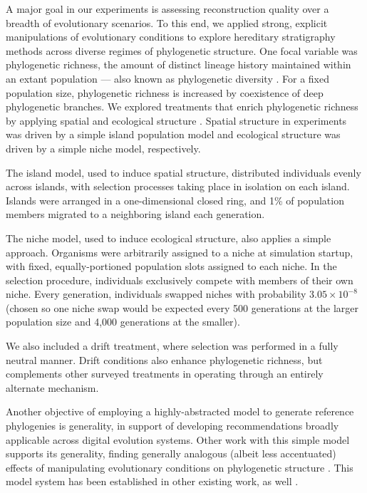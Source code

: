 A major goal in our experiments is assessing reconstruction quality over a breadth of evolutionary scenarios.
To this end, we applied strong, explicit manipulations of evolutionary conditions to explore hereditary stratigraphy methods across diverse regimes of phylogenetic structure.
One focal variable was phylogenetic richness, the amount of distinct lineage history maintained within an extant population --- also known as phylogenetic diversity \citep{tucker2017guide}.
For a fixed population size, phylogenetic richness is increased by coexistence of deep phylogenetic branches.
We explored treatments that enrich phylogenetic richness by applying spatial and ecological structure \citep{moreno2024ecology,gomez2019understanding,valiente2007facilitation}.
Spatial structure in experiments was driven by a simple island population model and ecological structure was driven by a simple niche model, respectively.

The island model, used to induce spatial structure, distributed individuals evenly across islands, with selection processes taking place in isolation on each island.
Islands were arranged in a one-dimensional closed ring, and 1\% of population members migrated to a neighboring island each generation.

The niche model, used to induce ecological structure, also applies a simple approach.
Organisms were arbitrarily assigned to a niche at simulation startup, with fixed, equally-portioned population slots assigned to each niche.
In the selection procedure, individuals exclusively compete with members of their own niche.
Every generation, individuals swapped niches with probability $3.05 \times 10^{-8}$ (chosen so one niche swap would be expected every 500 generations at the larger population size and 4,000 generations at the smaller).

We also included a drift treatment, where selection was performed in a fully neutral manner.
Drift conditions also enhance phylogenetic richness, but complements other surveyed treatments in operating through an entirely alternate mechanism.

Another objective of employing a highly-abstracted model to generate reference phylogenies is generality, in support of developing recommendations broadly applicable across digital evolution systems.
Other work with this simple model supports its generality, finding generally analogous (albeit less accentuated) effects of manipulating evolutionary conditions on phylogenetic structure \citep{moreno2024ecology}.
This model system has been established in other existing work, as well \citep{moreno2023toward}.

